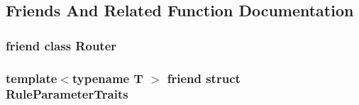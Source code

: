 \subsection{Friends And Related Function Documentation}
\hypertarget{classcrow_1_1_base_rule_ad1fd3424328f664cd049fe429e0e3dc6}{
\subsubsection[{Router}]{\setlength{\rightskip}{0pt plus 5cm}friend class {\bf Router}\hspace{0.3cm}{\ttfamily [friend]}}}\label{classcrow_1_1_base_rule_ad1fd3424328f664cd049fe429e0e3dc6}
\hypertarget{classcrow_1_1_base_rule_ae4e239e90000a93c0a1e16dc4cbf8b41}{
\subsubsection[{Rule\-Parameter\-Traits}]{\setlength{\rightskip}{0pt plus 5cm}template$<$typename T $>$ friend struct {\bf Rule\-Parameter\-Traits}\hspace{0.3cm}{\ttfamily [friend]}}}\label{classcrow_1_1_base_rule_ae4e239e90000a93c0a1e16dc4cbf8b41}


